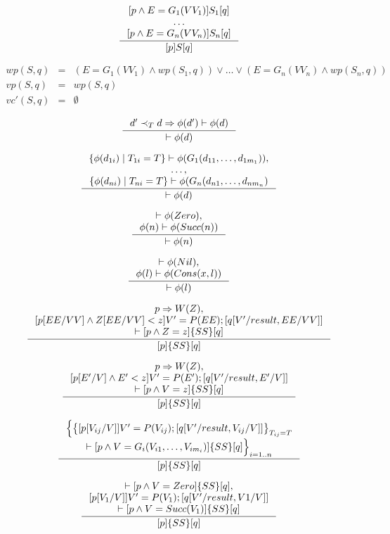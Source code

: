 \documentclass[12pt, a4paper]{book}
\begin{document}
  $$
  \inference{
    [p \land E = G_{1}(VV_{1})] S_{1} [q] \\
    \ldots \\
    [p \land E = G_{n}(VV_{n})] S_{n} [q]
    }
    {[p] S [q]}
  $$

  \begin{eqnarray*}
      wp(S,q) & = & (E = G_{1} (VV_{1}) \land wp(S_{1}, q)) \lor \ldots \lor (E = G_{n} (VV_{n}) \land wp(S_{n}, q)) \\
      vp(S, q) & = & wp (S, q) \\
      vc'(S,q) & = & \emptyset
  \end{eqnarray*}

  $$
  \inference{d' \prec_{T} d \Rightarrow \phi(d') \vdash \phi(d)}
  {\vdash \phi(d)}
  $$

  $$
  \inference{
    \{\phi(d_{1i}) \mid T_{1i} = T \} \vdash \phi(G_{1}(d_{11},\ldots,d_{1m_{1}})), \\
    \ldots, \\
    \{ \phi(d_{ni}) \mid T_{ni} = T\} \vdash \phi(G_{n}(d_{n1}, \ldots, d_{nm_{n}})
  }
  {\vdash \phi(d)}
  $$

  $$
  \inference{
    \vdash \phi(Zero), \\
    \phi(n) \vdash \phi(Succ(n))
  }
  {\vdash \phi(n)}
  $$

  $$
  \inference{
      \vdash \phi(Nil), \\
      \phi(l) \vdash \phi(Cons(x,l))
  }
  {\vdash \phi(l)}
  $$

  $$
  \inference{
    p \Rightarrow W(Z), \\
    [p[EE/VV] \land Z[EE/VV] < z] V' = P(EE); [q[V'/result, EE/VV]] \\
    \vdash [p \land Z = z] \{SS\} [q]
  }
  {[p] \{SS\} [q]}
  $$

  $$
  \inference{
    p \Rightarrow W(Z), \\
    [p[E'/V] \land E' < z] V' = P(E'); [q[V'/result, E'/V]] \\
    \vdash [p \land V = z] \{SS\} [q]
  }
  {[p] \{SS\} [q]}
  $$

  $$
  \inference{
    \Big\lbrace \big\lbrace [p[V_{ij}/V]] V' = P(V_{ij}); [q[V'/result, V_{ij}/V]] \big\rbrace_{T_{ij}=T} \\
    \vdash [p \land V = G_{i}(V_{i1}, \ldots, V_{im_{i}})] \{SS\} [q] \Big\rbrace_{i=1..n}
  }
  {[p] \lbrace SS \rbrace [q]}
  $$

  $$
  \inference{
    \vdash [p \land V = Zero] \lbrace SS\rbrace [q], \\
    [p[V_1/V]] V'=P(V_1); [q[V'/result, V1/V]] \\
    \vdash [p \land V = Succ(V_1)] \lbrace SS\rbrace [q] \\
  }
  {[p] \lbrace SS\rbrace [q]}
  $$
\end{document}
